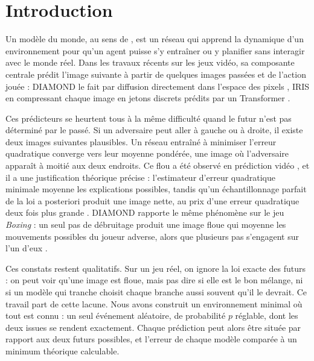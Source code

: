 \documentclass[a4paper, 11pt]{article}
\begin{document}
\section{Introduction}\label{sec:intro}

Un modèle du monde, au sens de \textcite{ha2018worldmodels}, est un réseau qui apprend la dynamique d'un environnement
pour qu'un agent puisse s'y entraîner ou y planifier sans interagir avec le monde réel. Dans les travaux récents sur les
jeux vidéo, sa composante centrale prédit l'image suivante à partir de quelques images passées et de l'action jouée :
DIAMOND le fait par diffusion directement dans l'espace des pixels \parencite{alonso2024diamond}, IRIS en compressant
chaque image en jetons discrets prédits par un Transformer \parencite{micheli2023iris}.

Ces prédicteurs se heurtent tous à la même difficulté quand le futur n'est pas déterminé par le passé. Si un adversaire
peut aller à gauche ou à droite, il existe deux images suivantes plausibles. Un réseau entraîné à minimiser l'erreur
quadratique converge vers leur moyenne pondérée, une image où l'adversaire apparaît à moitié aux deux endroits. Ce flou
a été observé en prédiction vidéo \parencite{mathieu2016deep, babaeizadeh2018sv2p}, et il a une justification théorique
précise : l'estimateur d'erreur quadratique minimale moyenne les explications possibles, tandis qu'un échantillonnage
parfait de la loi a posteriori produit une image nette, au prix d'une erreur quadratique deux fois plus grande
\parencite{blau2018perception}. DIAMOND rapporte le même phénomène sur le jeu \emph{Boxing} : un seul pas de débruitage
produit une image floue qui moyenne les mouvements possibles du joueur adverse, alors que plusieurs pas s'engagent sur
l'un d'eux \parencite[§5.2]{alonso2024diamond}.

Ces constats restent qualitatifs. Sur un jeu réel, on ignore la loi exacte des futurs : on peut voir qu'une image est
floue, mais pas dire si elle est le bon mélange, ni si un modèle qui tranche choisit chaque branche aussi souvent qu'il le
devrait. Ce travail part de cette lacune. Nous avons construit un environnement minimal où tout est connu : un seul
événement aléatoire, de probabilité $p$ réglable, dont les deux issues se rendent exactement. Chaque prédiction peut alors
être située par rapport aux deux futurs possibles, et l'erreur de chaque modèle comparée à un minimum théorique calculable.
\end{document}
